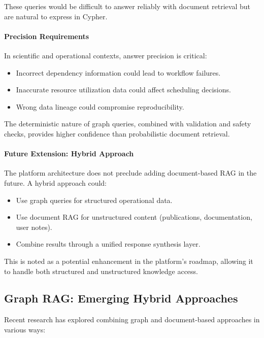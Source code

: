 \documentclass[a4paper,twoside]{sapthesis}
\begin{document}
These queries would be difficult to answer reliably with document retrieval but are natural to express in Cypher.

\paragraph{Precision Requirements}

In scientific and operational contexts, answer precision is critical:

\begin{itemize}
    \item Incorrect dependency information could lead to workflow failures.
    \item Inaccurate resource utilization data could affect scheduling decisions.
    \item Wrong data lineage could compromise reproducibility.
\end{itemize}

The deterministic nature of graph queries, combined with validation and safety checks, provides higher confidence than probabilistic document retrieval.

\paragraph{Future Extension: Hybrid Approach}

The platform architecture does not preclude adding document-based RAG in the future. A hybrid approach could:

\begin{itemize}
    \item Use graph queries for structured operational data.
    \item Use document RAG for unstructured content (publications, documentation, user notes).
    \item Combine results through a unified response synthesis layer.
\end{itemize}

This is noted as a potential enhancement in the platform's roadmap, allowing it to handle both structured and unstructured knowledge access.

\subsection{Graph RAG: Emerging Hybrid Approaches}

Recent research has explored combining graph and document-based approaches in various ways:
\end{document}
